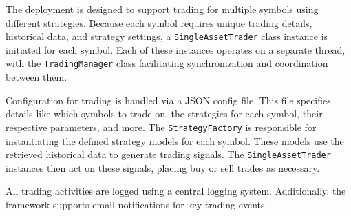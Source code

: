 The deployment is designed to support trading for multiple symbols using different strategies.
Because each symbol requires unique trading details, historical data, and strategy settings, a \texttt{SingleAssetTrader} class instance is initiated for each symbol.
Each of these instances operates on a separate thread, with the \texttt{TradingManager} class facilitating synchronization and coordination between them.

Configuration for trading is handled via a JSON config file.
This file specifies details like which symbols to trade on, the strategies for each symbol, their respective parameters, and more.
The \texttt{StrategyFactory} is responsible for instantiating the defined strategy models for each symbol.
These models use the retrieved historical data to generate trading signals. The \texttt{SingleAssetTrader} instances then act on these signals, placing buy or sell trades as necessary.

All trading activities are logged using a central logging system.
Additionally, the framework supports email notifications for key trading events.
